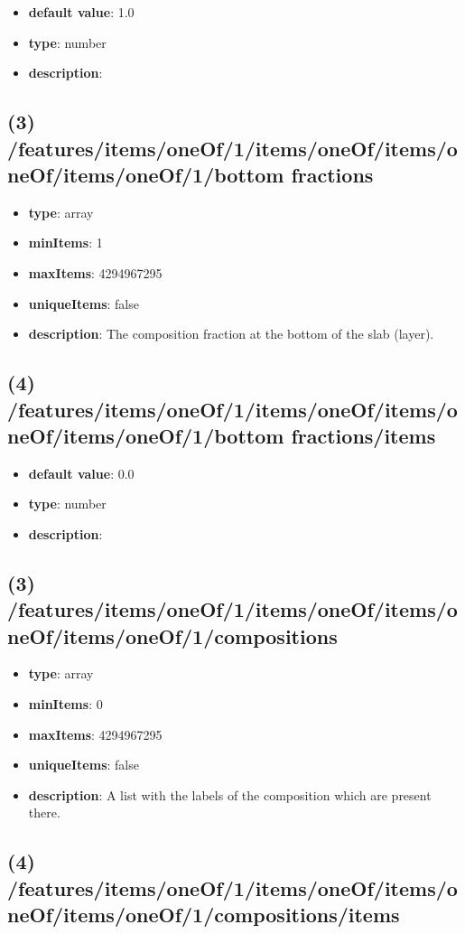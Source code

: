 \begin{itemize}[leftmargin=4em]\item {\bf default value}: 1.0
\item {\bf type}: number
\item {\bf description}: 
\end{itemize}\subsection{(3) /features/items/oneOf/1/items/oneOf/items/oneOf/items/oneOf/1/bottom fractions}
\begin{itemize}[leftmargin=3em]\item {\bf type}: array
\item {\bf minItems}: 1
\item {\bf maxItems}: 4294967295
\item {\bf uniqueItems}: false
\item {\bf description}: The composition fraction at the bottom of the slab (layer).
\end{itemize}\subsection{(4) /features/items/oneOf/1/items/oneOf/items/oneOf/items/oneOf/1/bottom fractions/items}
\begin{itemize}[leftmargin=4em]\item {\bf default value}: 0.0
\item {\bf type}: number
\item {\bf description}: 
\end{itemize}\subsection{(3) /features/items/oneOf/1/items/oneOf/items/oneOf/items/oneOf/1/compositions}
\begin{itemize}[leftmargin=3em]\item {\bf type}: array
\item {\bf minItems}: 0
\item {\bf maxItems}: 4294967295
\item {\bf uniqueItems}: false
\item {\bf description}: A list with the labels of the composition which are present there.
\end{itemize}\subsection{(4) /features/items/oneOf/1/items/oneOf/items/oneOf/items/oneOf/1/compositions/items}
